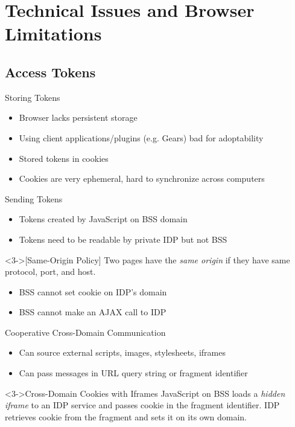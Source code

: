 \documentclass[handout]{beamer}
\begin{document}
\section[Technical Issues]{Technical Issues and Browser Limitations}

\subsection{Access Tokens}

\begin{frame}{Storing Tokens}
  \begin{itemize}
    \item<1-> Browser lacks persistent storage
    \item<2-> Using client applications/plugins (e.g. Gears) bad for adoptability
    \item<3-> Stored tokens in cookies
    \item<4-> Cookies are very ephemeral, hard to synchronize across computers
  \end{itemize}
\end{frame}

\begin{frame}{Sending Tokens}
  \begin{itemize}
    \item<1-> Tokens created by JavaScript on BSS domain
    \item<2-> Tokens need to be readable by private IDP but not BSS
  \end{itemize}

  \begin{definition}<3->[Same-Origin Policy]
    Two pages have the \emph{same origin} if they have same protocol, port, and
    host.
  \end{definition}

  \begin{itemize}
    \item<4-> BSS cannot set cookie on IDP's domain
    \item<5-> BSS cannot make an AJAX call to IDP
  \end{itemize}
\end{frame}

\begin{frame}{Cooperative Cross-Domain Communication}
  \begin{itemize}
    \item<1-> Can source external scripts, images, stylesheets, iframes
    \item<2-> Can pass messages in URL query string or fragment identifier
  \end{itemize}

  \begin{alertblock}<3->{Cross-Domain Cookies with Iframes}
    JavaScript on BSS loads a \emph{hidden iframe} to an IDP service and passes
    cookie in the fragment identifier. IDP retrieves cookie from the fragment
    and sets it on its own domain.
  \end{alertblock}
\end{frame}
\end{document}
